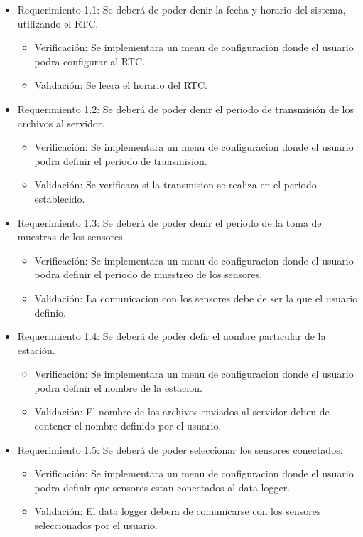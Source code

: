 \documentclass[
11pt, %
]{charter}
\begin{document}
\begin{itemize}
\item Requerimiento 1.1: Se deberá de poder denir la fecha y horario del sistema, utilizando el RTC.
	\begin{itemize}
		\item Verificación: Se implementara un menu de configuracion donde el usuario podra configurar al RTC.
		\item Validación: Se leera el horario del RTC.
	\end{itemize}
\item Requerimiento 1.2: Se deberá de poder denir el periodo de transmisión de los archivos al servidor.
	\begin{itemize}
		\item Verificación: Se implementara un menu de configuracion donde el usuario podra definir el periodo de transmision.
		\item Validación: Se verificara si la transmision se realiza en el periodo establecido.
	\end{itemize}
\item Requerimiento 1.3: Se deberá de poder denir el periodo de la toma de muestras de los sensores.
	\begin{itemize}
		\item Verificación: Se implementara un menu de configuracion donde el usuario podra definir el periodo de muestreo de los sensores.
		\item Validación: La comunicacion con los sensores debe de ser la que el usuario definio.
	\end{itemize}
\item Requerimiento 1.4: Se deberá de poder defir el nombre particular de la estación.
	\begin{itemize}
		\item Verificación: Se implementara un menu de configuracion donde el usuario podra definir el nombre de la estacion.
		\item Validación: El nombre de los archivos enviados al servidor deben de contener el nombre definido por el usuario.
	\end{itemize}
\item Requerimiento 1.5: Se deberá de poder seleccionar los sensores conectados.
	\begin{itemize}
		\item Verificación: Se implementara un menu de configuracion donde el usuario podra definir que sensores estan conectados al data logger.
		\item Validación: El data logger debera de comunicarse con los sensores seleccionados por el usuario.

\end{itemize}
\end{itemize}
\end{document}
